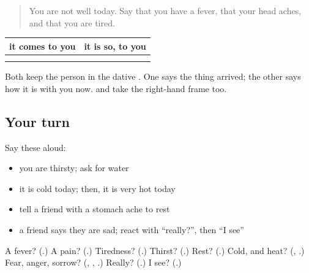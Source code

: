 \label{lesson:TE-R87-second-pass-feelings}



\begin{quote}
You are not well today. Say that you have a fever, that your head aches, and that you are tired.
\end{quote}

\begin{grammarlens}[title={Grammar Lens: two ways a feeling reaches you}]
\noindent
\begin{tabularx}{\linewidth}{@{}>{\raggedright\arraybackslash}X>{\raggedright\arraybackslash}X@{}}
\toprule
\textbf{it comes to you} & \textbf{it is so, to you} \\
\midrule
\textbf{\te{నాకు} \te{జ్వరం} \te{వచ్చింది}} & \textbf{\te{నాకు} \te{అలసటగా} \te{ఉంది}} \\
\textbf{\te{నాకు} \te{కోపం} \te{వచ్చింది}} & \textbf{\te{నాకు} \te{భయంగా} \te{ఉంది}} \\
\bottomrule
\end{tabularx}

Both keep the person in the dative \textbf{}. One says the thing arrived; the other says how it is with you now. \textbf{} and \textbf{} take the right-hand frame too.
\end{grammarlens}

\subsection*{Your turn}
Say these aloud:

\begin{itemize}
\raggedright
  \item you are thirsty; ask for water
  \item it is cold today; then, it is very hot today
  \item tell a friend with a stomach ache to rest
  \item a friend says they are sad; react with \textquotedblleft{}really?\textquotedblright{}, then \textquotedblleft{}I see\textquotedblright{}
\end{itemize}

\begin{tcolorbox}[breakable,colback=teal!4,colframe=teal!35!black,title={Before you move on}]
A fever? (\textbf{}.) A pain? (\textbf{}.) Tiredness? (\textbf{}.) Thirst? (\textbf{}.) Rest? (\textbf{}.) Cold, and heat? (\textbf{}, \textbf{}.) Fear, anger, sorrow? (\textbf{}, \textbf{}, \textbf{}.) Really? (\textbf{}.) I see? (\textbf{}.)
\end{tcolorbox}
